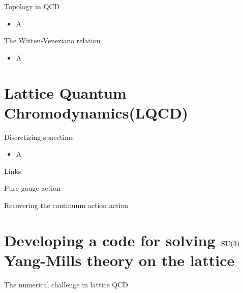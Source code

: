 \documentclass[10pt,show notes on second screen]{beamer}
\begin{document}
\begin{frame}{Topology in QCD}
    \begin{itemize}[<+->]
        \item A
    \end{itemize}
\end{frame}

\begin{frame}{The Witten-Veneziano relation}
    \begin{itemize}[<+->]
        \item A
    \end{itemize}
\end{frame}

\section{Lattice Quantum Chromodynamics(LQCD)}

\begin{frame}{Discretizing spacetime}
    \begin{itemize}[<+->]
        \item A
    \end{itemize}
\end{frame}

\begin{frame}{Links}
\end{frame}

\begin{frame}{Pure gauge action}
\end{frame}

\begin{frame}{Recovering the continuum action action}
\end{frame}

\section{Developing a code for solving \texorpdfstring{$\mathrm{SU}(3)$}{SU3} Yang-Mills theory on the lattice}

\begin{frame}{The numerical challenge in lattice QCD}
\end{frame}
\end{document}
